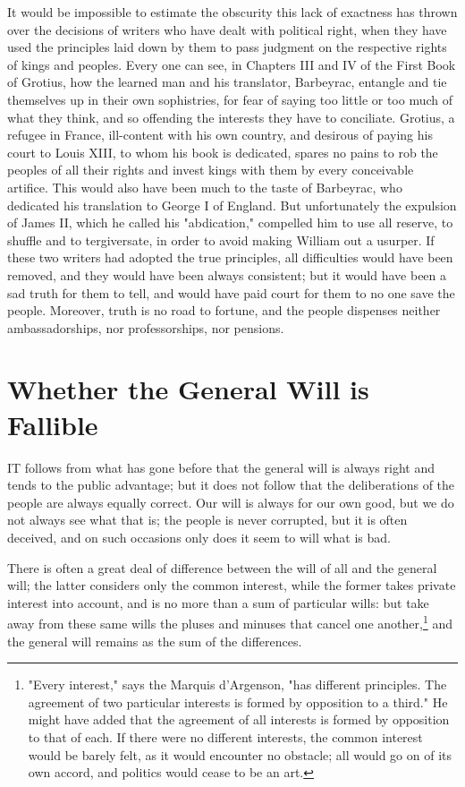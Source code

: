 \documentclass[12pt]{book}
\begin{document}
It would be impossible to estimate the obscurity this lack of exactness has thrown over the decisions of writers who have dealt with political right, when they have used the principles laid down by them to pass judgment on the respective rights of kings and peoples. Every one can see, in Chapters III and IV of the First Book of Grotius, how the learned man and his translator, Barbeyrac, entangle and tie themselves up in their own sophistries, for fear of saying too little or too much of what they think, and so offending the interests they have to conciliate. Grotius, a refugee in France, ill-content with his own country, and desirous of paying his court to Louis XIII, to whom his book is dedicated, spares no pains to rob the peoples of all their rights and invest kings with them by every conceivable artifice. This would also have been much to the taste of Barbeyrac, who dedicated his translation to George I of England. But unfortunately the expulsion of James II, which he called his "abdication," compelled him to use all reserve, to shuffle and to tergiversate, in order to avoid making William out a usurper. If these two writers had adopted the true principles, all difficulties would have been removed, and they would have been always consistent; but it would have been a sad truth for them to tell, and would have paid court for them to no one save the people. Moreover, truth is no road to fortune, and the people dispenses neither ambassadorships, nor professorships, nor pensions.

\section{Whether the General Will is Fallible}
IT follows from what has gone before that the general will is always right and tends to the public advantage; but it does not follow that the deliberations of the people are always equally correct. Our will is always for our own good, but we do not always see what that is; the people is never corrupted, but it is often deceived, and on such occasions only does it seem to will what is bad.

There is often a great deal of difference between the will of all and the general will; the latter considers only the common interest, while the former takes private interest into account, and is no more than a sum of particular wills: but take away from these same wills the pluses and minuses that cancel one another,\footnote{"Every interest," says the Marquis d'Argenson, "has different principles. The agreement of two particular interests is formed by opposition to a third." He might have added that the agreement of all interests is formed by opposition to that of each. If there were no different interests, the common interest would be barely felt, as it would encounter no obstacle; all would go on of its own accord, and politics would cease to be an art.} and the general will remains as the sum of the differences.
\end{document}

